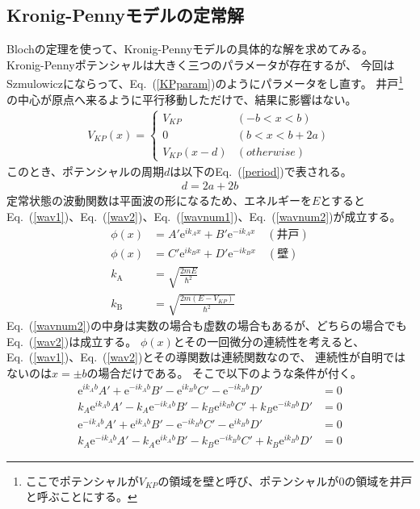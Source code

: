 \documentclass[autodetect-engine,dvipdfmx-if-dvi,ja=standard,a4paper,layout=v2]{bxjsreport}
\newcommand{\eref}[1]{Eq.~(\ref{#1})}
\begin{document}
    \subsection{Kronig-Pennyモデルの定常解}
    Blochの定理を使って、Kronig-Pennyモデルの具体的な解を求めてみる。
    Kronig-Pennyポテンシャルは大きく三つのパラメータが存在するが、
    今回はSzmulowiczにならって、\eref{KPparam}のようにパラメータをし直す。
    井戸\footnote{
    ここでポテンシャルが$V_{KP}$の領域を壁と呼び、ポテンシャルが$0$の領域を井戸と呼ぶことにする。
    }の中心が原点へ来るように平行移動しただけで、結果に影響はない。
    \begin{align}
    V_{KP}(x)=\begin{cases}
    V_{KP}&(-b<x<b)\\
    0&(b<x<b+2a)\\
    V_{KP}(x-d)&(otherwise)
    \end{cases}\label{KPparam}
    \end{align}
     このとき、ポテンシャルの周期$d$は以下の\eref{period}で表される。
    \begin{align}
    d=2a+2b\label{period}
    \end{align}
    定常状態の波動関数は平面波の形になるため、エネルギーを$E$とすると
    \eref{wav1}、\eref{wav2}、\eref{wavnum1}、\eref{wavnum2}が成立する。
    \begin{align}
    \phi(x)&=A'\mathrm{e}^{ik_Ax}+B'\mathrm{e}^{-ik_Ax}\quad(井戸)\label{wav1}\\
    \phi(x)&=C'\mathrm{e}^{ik_Bx}+D'\mathrm{e}^{-ik_Bx}\quad(壁)\label{wav2}\\
    k_\mathrm{A}&=\sqrt{\frac{2mE}{\hbar^2}}\label{wavnum1}\\
    k_\mathrm{B}&=\sqrt{\frac{2m(E-V_{KP})}{\hbar^2}}\label{wavnum2}
    \end{align}
   \eref{wavnum2}の中身は実数の場合も虚数の場合もあるが、どちらの場合でも\eref{wav2}は成立する。
    $\phi(x)$とその一回微分の連続性を考えると、\eref{wav1}、\eref{wav2}とその導関数は連続関数なので、
    連続性が自明ではないのは$x=\pm b$の場合だけである。
    そこで以下のような条件が付く。
    \begin{align}
    \mathrm{e}^{ik_Ab}A'+\mathrm{e}^{-ik_Ab}B'-\mathrm{e}^{ik_Bb}C'-\mathrm{e}^{-ik_Bb}D'&=0\label{cc1}\\
    k_A\mathrm{e}^{ik_Ab}A'-k_A\mathrm{e}^{-ik_Ab}B'-k_B\mathrm{e}^{ik_Bb}C'+k_B\mathrm{e}^{-ik_Bb}D'&=0\label{cc2}\\
    \mathrm{e}^{-ik_Ab}A'+\mathrm{e}^{ik_Ab}B'-\mathrm{e}^{-ik_Bb}C'-\mathrm{e}^{ik_Bb}D'&=0\label{cc3}\\
    k_A\mathrm{e}^{-ik_Ab}A'-k_A\mathrm{e}^{ik_Ab}B'-k_B\mathrm{e}^{-ik_Bb} C'+k_B\mathrm{e}^{ik_Bb}D'&=0\label{cc4}
    \end{align}
\end{document}
